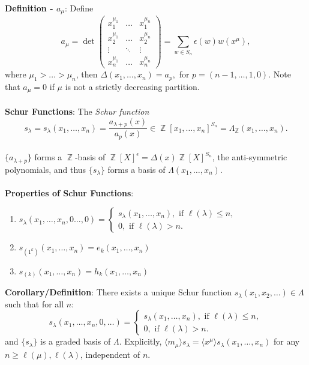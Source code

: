 \documentclass{article}
\DeclareMathOperator{\Z}{\mathbb{Z}}
\begin{document}
\textbf{Definition - $a_\mu$}: Define $$a_\mu = \det \begin{pmatrix}
    x_1^{\mu_1} & \dots & x_1^{\mu_n} \\
    x_2^{\mu_1} & \dots & x_2^{\mu_n} \\
    \vdots & \ddots & \vdots \\
    x_n^{\mu_1} & \dots & x_n^{\mu_n}
\end{pmatrix} = \sum_{w \in S_n} \epsilon(w) w(x^\mu),$$ where $\mu_1 > \dots > \mu_n$, then $\Delta(x_1, \dots, x_n) = a_p,$ for $p = (n - 1, \dots, 1, 0)$. Note that $a_\mu = 0$ if $\mu$ is not a strictly decreasing partition. \\ \\
\textbf{Schur Functions}: The \textit{Schur function} $$s_\lambda = s_\lambda(x_1, \dots, x_n) = \frac{a_{\lambda + p}(x)}{a_p(x)} \in \Z[x_1, \dots, x_n]^{S_n} = \Lambda_{\Z}(x_1, \dots, x_n).$$ \\
$\{a_{\lambda + p}\}$ forms a $\Z$-basis of $\Z[X]^\epsilon = \Delta(x)\Z[X]^{S_n}$, the anti-symmetric polynomials, and thus $\{s_\lambda\}$ forms a basis of $\Lambda (x_1, \dots, x_n)$. \\ \\
\textbf{Properties of Schur Functions}: \begin{enumerate}
    \item $s_\lambda(x_1, \dots, x_n, 0 \dots, 0) = \begin{cases}
        s_\lambda(x_1, \dots, x_n), \text{ if } \ell(\lambda) \leq n, \\
        0, \text{ if } \ell(\lambda) > n.
    \end{cases}$
    \item $s_{(1^k)} (x_1, \dots, x_n) = e_k(x_1, \dots, x_n)$
    \item $s_{(k)} (x_1, \dots, x_n) = h_k(x_1, \dots, x_n)$
\end{enumerate} $ $ \\
\textbf{Corollary/Definition}: There exists a unique Schur function $s_\lambda(x_1, x_2, \dots) \in \Lambda$ such that for all $n$: $$s_\lambda(x_1, \dots, x_n, 0, \dots) = \begin{cases}
    s_\lambda(x_1, \dots, x_n), \text{ if } \ell(\lambda) \leq n, \\
    0, \text{ if } \ell(\lambda) > n.
\end{cases}$$ and $\{s_\lambda\}$ is a graded basis of $\Lambda$. Explicitly, $\langle m_\mu \rangle s_\lambda = \langle x^\mu \rangle s_\lambda(x_1, \dots, x_n)$ for any $n \geq \ell(\mu), \ell(\lambda)$, independent of $n$. \\ \\
\end{document}
